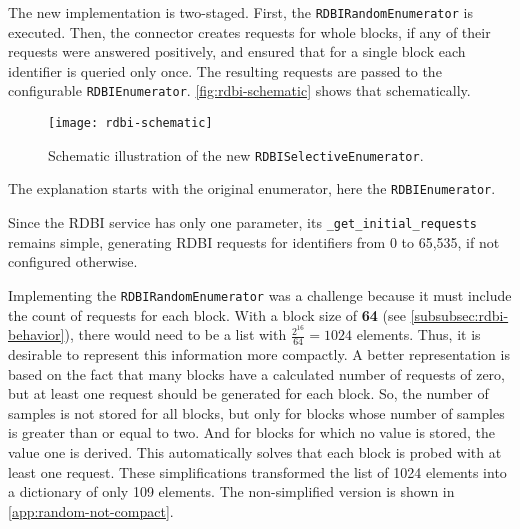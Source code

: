 The new implementation is two-staged. First, the \texttt{RDBIRandomEnumerator} is executed. Then, the connector creates requests for whole blocks, if any of their requests were answered positively, and ensured that for a single block each identifier is queried only once. The resulting requests are passed to the configurable \texttt{RDBIEnumerator}. \autoref{fig:rdbi-schematic} shows that schematically.

\begin{figure}[htb]
    \centering
    \texttt{[image: rdbi-schematic]}
    \caption{Schematic illustration of the new \texttt{RDBISelectiveEnumerator}.}
    \label{fig:rdbi-schematic}
\end{figure}

The explanation starts with the original enumerator, here the \texttt{RDBIEnumerator}.


Since the RDBI service has only one parameter, its \texttt{_get_initial_requests} remains simple, generating RDBI requests for identifiers from 0 to 65,535, if not configured otherwise.

Implementing the \texttt{RDBIRandomEnumerator} was a challenge because it must include the count of requests for each block. With a block size of \textbf{64} (see \autoref{subsubsec:rdbi-behavior}), there would need to be a list with $\frac{2^{16}}{64} = 1024$ elements. Thus, it is desirable to represent this information more compactly. A better representation is based on the fact that many blocks have a calculated number of requests of zero, but at least one request should be generated for each block. So, the number of samples is not stored for all blocks, but only for blocks whose number of samples is greater than or equal to two. And for blocks for which no value is stored, the value one is derived. This automatically solves that each block is probed with at least one request. These simplifications transformed the list of 1024 elements into a dictionary of only 109 elements. The non-simplified version is shown in \autoref{app:random-not-compact}.

